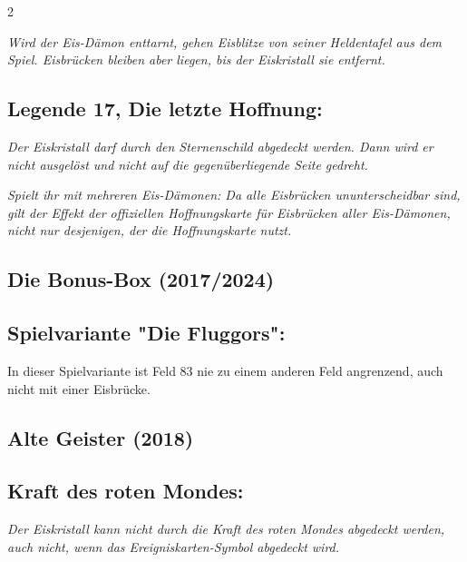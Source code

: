 \documentclass[10pt, a4paper, oneside]{book}
\newcommand{\fan}[1]{\textit{#1}}
\begin{document}
\begin{multicols*}{2}
\begin{bgcolor}
\fan{Wird der Eis-Dämon enttarnt, gehen Eisblitze von seiner Heldentafel aus dem Spiel. Eisbrücken bleiben aber liegen, bis der Eiskristall sie entfernt.}



\subsection{Legende 17, Die letzte Hoffnung:}

\fan{Der Eiskristall darf durch den Sternenschild abgedeckt werden. Dann wird er nicht ausgelöst und nicht auf die gegenüberliegende Seite gedreht.}

\fan{Spielt ihr mit mehreren Eis-Dämonen: Da alle Eisbrücken ununterscheidbar sind, gilt der Effekt der offiziellen Hoffnungskarte für Eisbrücken aller Eis-Dämonen, nicht nur desjenigen, der die Hoffnungskarte nutzt.}


\end{bgcolor}






\begin{bgcolor}[color-BB]
\section{Die Bonus-Box (2017/2024)}

\subsection{Spielvariante "Die Fluggors":}

In dieser Spielvariante ist Feld 83 nie zu einem anderen Feld angrenzend, auch nicht mit einer Eisbrücke.
\supercite{88779}

\end{bgcolor}


\begin{bgcolor}[color-AG]
\section{Alte Geister (2018)}


\subsection{Kraft des roten Mondes:}

\fan{Der Eiskristall kann nicht durch die Kraft des roten Mondes abgedeckt werden, auch nicht, wenn das Ereigniskarten-Symbol abgedeckt wird.}


\end{bgcolor}
\end{multicols*}
\end{document}
